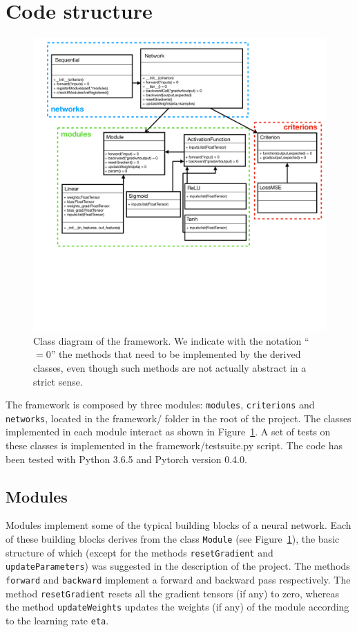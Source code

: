 \documentclass[10pt,final,a4paper]{article}
\begin{document}
\section{Code structure}
\begin{figure}
\centering
\includegraphics[scale=0.42, clip=true, trim=45 270 0 10]{diagram.pdf}
\caption{Class diagram of the framework. We indicate with the notation ``$=0$'' the methods that need to be implemented by the derived classes, even though such methods are not actually abstract in a strict sense.}
\label{fig:diagram}
\end{figure}
The framework is composed by three modules: \verb|modules|, \verb|criterions| and \verb|networks|, located in the framework/ folder in the root of the project. The classes implemented in each module interact as shown in Figure~\ref{fig:diagram}. A set of tests on these classes is implemented in the framework/testsuite.py script. The code has been tested with Python 3.6.5 and Pytorch version 0.4.0.
\subsection{Modules}
Modules implement some of the typical building blocks of a neural network. Each of these building blocks derives from the class \verb|Module| (see Figure~\ref{fig:diagram}), the basic structure of which (except for the methods \verb|resetGradient| and \verb|updateParameters|) was suggested in the description of the project. The methods \verb|forward| and \verb|backward| implement a forward and backward pass respectively. The method \verb|resetGradient| resets all the gradient tensors (if any) to zero, whereas the method \verb|updateWeights| updates the weights (if any) of the module according to the learning rate \verb|eta|.
\end{document}
